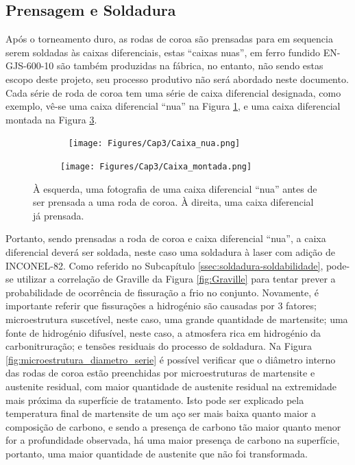 \subsection{Prensagem e Soldadura} \label{ssec:materials_CS_prens_e_sold}
Após o torneamento duro, as rodas de coroa são prensadas para em sequencia serem soldadas às caixas diferenciais, estas “caixas nuas”, em ferro fundido EN-GJS-600-10 são também produzidas na fábrica, no entanto, não sendo estas escopo deste projeto, seu processo produtivo não será abordado neste documento. Cada série de roda de coroa tem uma série de caixa diferencial designada, como exemplo, vê-se uma caixa diferencial “nua” na Figura \ref{fig:Caixa_nua_DB45}, e uma caixa diferencial montada na Figura \ref{fig:Caixa_montada_DB45}.
\newpage
\begin{figure}[htb]
    \centering
    \begin{subfigure}{.5\textwidth}\
        \centering
        \texttt{[image: Figures/Cap3/Caixa\_nua.png]}
        \caption[]%
        {}
        \label{fig:Caixa_nua_DB45}
    \end{subfigure}%
    \begin{subfigure}{.5\textwidth}
        \centering
        \texttt{[image: Figures/Cap3/Caixa\_montada.png]}
        \caption{}
        \label{fig:Caixa_montada_DB45}
    \end{subfigure}
    \caption[Caixa diferencial “nua”, e caixa diferencial montada.]%
    {À esquerda, uma fotografia de uma caixa diferencial “nua” antes de ser prensada a uma roda de coroa. À direita, uma caixa diferencial já prensada.}
\end{figure}
\par
Portanto, sendo prensadas a roda de coroa e caixa diferencial “nua”, a caixa diferencial deverá ser soldada, neste caso uma soldadura à laser com adição de INCONEL-82. Como referido no Subcapítulo \ref{ssec:soldadura-soldabilidade}, pode-se utilizar a correlação de Graville da Figura \ref{fig:Graville} para tentar prever a probabilidade de ocorrência de fissuração a frio no conjunto. Novamente, é importante referir que fissurações a hidrogénio são causadas por 3 fatores; microestrutura suscetível, neste caso, uma grande quantidade de martensite; uma fonte de hidrogénio difusível, neste caso, a atmosfera rica em hidrogénio da carbonitruração; e tensões residuais do processo de soldadura. Na Figura \ref{fig:microestrutura_diametro_serie} é possível verificar que o diâmetro interno das rodas de coroa estão preenchidas por microestruturas de martensite e austenite residual, com maior quantidade de austenite residual na extremidade mais próxima da superfície de tratamento. Isto pode ser explicado pela temperatura final de martensite de um aço ser mais baixa quanto maior a composição de carbono, e sendo a presença de carbono tão maior quanto menor for a profundidade observada, há uma maior presença de carbono na superfície, portanto, uma maior quantidade de austenite que não foi transformada.
